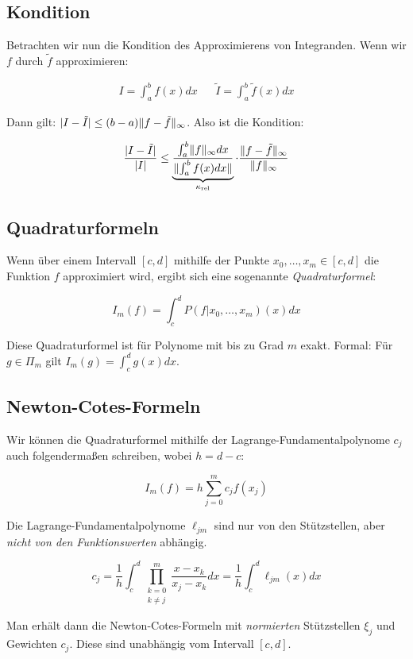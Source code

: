 \documentclass[a4paper,parskip=half*,DIV=15,fontsize=11pt]{scrartcl}
\DeclarePairedDelimiter\abs{\lvert}{\rvert}
\DeclarePairedDelimiter\norm{\lVert}{\rVert}
\begin{document}
\subsection{Kondition}

Betrachten wir nun die Kondition des Approximierens von Integranden. Wenn wir $f$ durch $\tilde{f}$ approximieren:

\begin{align*}
	I = \int_a^b f(x) dx & & \tilde{I} = \int_a^b \tilde{f}(x) dx
\end{align*}

Dann gilt: $\abs{I - \tilde{I}} \leq (b - a) \norm{f - \tilde{f}}_\infty$. Also ist die Kondition:

\[
  \frac{\abs{I - \tilde{I}}}{\abs{I}} \leq \underbrace{\frac{\int_a^b \norm{f}_\infty dx}{\norm{\int_a^b f(x) dx}}}_{\kappa_\mathrm{rel}} \cdot \frac{\norm{f - \tilde{f}}_\infty}{\norm{f}_\infty}
\]

\subsection{Quadraturformeln}

Wenn über einem Intervall $[c, d]$ mithilfe der Punkte $x_0, \ldots, x_m \in [c, d]$ die Funktion $f$ approximiert wird, ergibt sich eine sogenannte \emph{Quadraturformel}:

\[
  I_m(f) = \int_c^d P(f \vert x_0, \ldots, x_m)(x) dx
\]

Diese Quadraturformel ist für Polynome mit bis zu Grad $m$ exakt. Formal: Für $g \in \Pi_m$ gilt $I_m(g) = \int_c^d g(x) dx$.

\subsection{Newton-Cotes-Formeln}

Wir können die Quadraturformel mithilfe der Lagrange-Fundamentalpolynome $c_j$ auch folgendermaßen schreiben, wobei $h = d - c$:

\[
  I_m(f) = h \sum_{j=0}^m c_j f(x_j)
\]

Die Lagrange-Fundamentalpolynome $\ell_{jm}$ sind nur von den Stützstellen, aber \emph{nicht von den Funktionswerten} abhängig.

\[
  c_j = \frac{1}{h} \int_c^d \prod_{\substack{k=0 \\ k\neq j}}^m \frac{x - x_k}{x_j - x_k} dx = \frac{1}{h} \int_c^d \ell_{jm}(x) dx
\]

Man erhält dann die Newton-Cotes-Formeln mit \emph{normierten} Stützstellen $\xi_j$ und Gewichten $c_j$. Diese sind unabhängig vom Intervall $[c, d]$.
\end{document}
